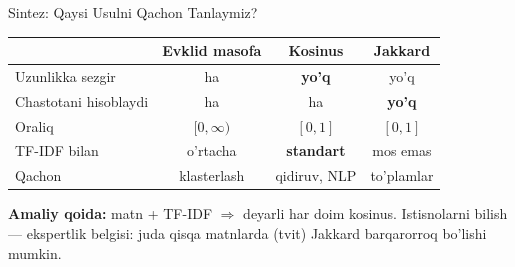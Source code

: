 \documentclass[aspectratio=169,11pt]{beamer}
\begin{document}
\begin{frame}{Sintez: Qaysi Usulni Qachon Tanlaymiz?}
  \begin{center}\small
  \begin{tabular}{lccc}
    \toprule
    & \textbf{Evklid masofa} & \textbf{Kosinus} & \textbf{Jakkard} \\
    \midrule
    Uzunlikka sezgir & ha & \textbf{yo'q} & yo'q \\
    Chastotani hisoblaydi & ha & ha & \textbf{yo'q} \\
    Oraliq & $[0,\infty)$ & $[0,1]$ & $[0,1]$ \\
    TF-IDF bilan & o'rtacha & \textbf{standart} & mos emas \\
    Qachon & klasterlash & qidiruv, NLP & to'plamlar \\
    \bottomrule
  \end{tabular}
  \end{center}
  \vspace{0.4em}
  \begin{tcolorbox}[okbox]
    \small \textbf{Amaliy qoida:} matn + TF-IDF $\Rightarrow$ deyarli
    har doim kosinus. Istisnolarni bilish --- ekspertlik belgisi:
    juda qisqa matnlarda (tvit) Jakkard barqarorroq bo'lishi mumkin.
  \end{tcolorbox}
\end{frame}
\end{document}

